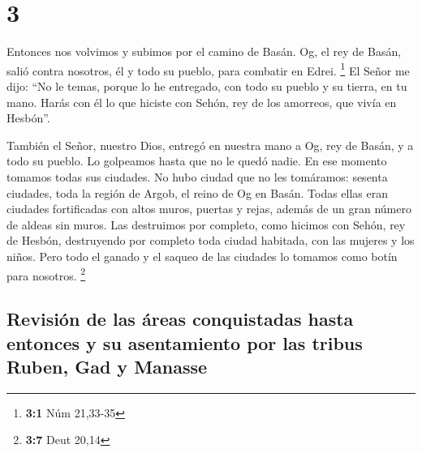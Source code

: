 \hypertarget{section-2}{%
\section{3}\label{section-2}}

 Entonces nos volvimos y subimos por el camino de Basán.
Og, el rey de Basán, salió contra nosotros, él y todo su pueblo, para
combatir en Edrei. \footnote{\textbf{3:1} Núm 21,33-35} 
El Señor me dijo: ``No le temas, porque lo he entregado, con todo su
pueblo y su tierra, en tu mano. Harás con él lo que hiciste con Sehón,
rey de los amorreos, que vivía en Hesbón''.

 También el Señor, nuestro Dios, entregó en nuestra mano a
Og, rey de Basán, y a todo su pueblo. Lo golpeamos hasta que no le quedó
nadie.  En ese momento tomamos todas sus ciudades. No hubo
ciudad que no les tomáramos: sesenta ciudades, toda la región de Argob,
el reino de Og en Basán.  Todas ellas eran ciudades
fortificadas con altos muros, puertas y rejas, además de un gran número
de aldeas sin muros.  Las destruimos por completo, como
hicimos con Sehón, rey de Hesbón, destruyendo por completo toda ciudad
habitada, con las mujeres y los niños.  Pero todo el
ganado y el saqueo de las ciudades lo tomamos como botín para nosotros.
\footnote{\textbf{3:7} Deut 20,14}

\hypertarget{revisiuxf3n-de-las-uxe1reas-conquistadas-hasta-entonces-y-su-asentamiento-por-las-tribus-ruben-gad-y-manasse}{%
\subsection{Revisión de las áreas conquistadas hasta entonces y su
asentamiento por las tribus Ruben, Gad y
Manasse}\label{revisiuxf3n-de-las-uxe1reas-conquistadas-hasta-entonces-y-su-asentamiento-por-las-tribus-ruben-gad-y-manasse}}

